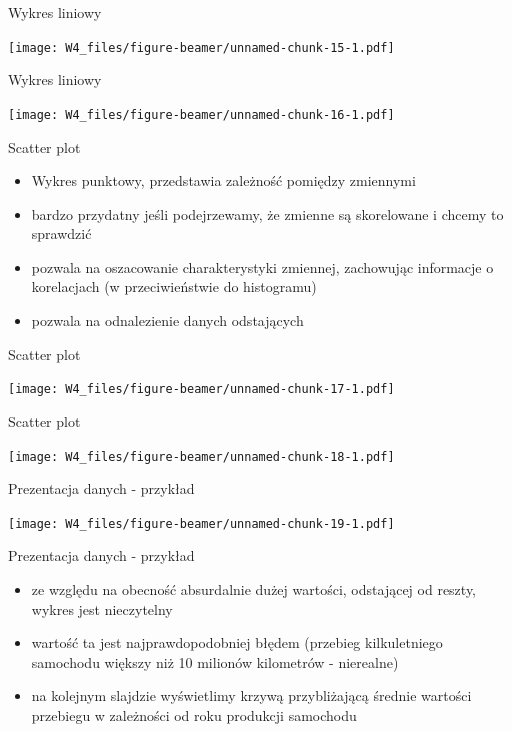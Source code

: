 \documentclass[ignorenonframetext,]{beamer}
\providecommand{\tightlist}{%
\setlength{\itemsep}{0pt}\setlength{\parskip}{0pt}}
\begin{document}
\begin{frame}{Wykres liniowy}

\texttt{[image: W4\_files/figure-beamer/unnamed-chunk-15-1.pdf]}

\end{frame}

\begin{frame}{Wykres liniowy}

\texttt{[image: W4\_files/figure-beamer/unnamed-chunk-16-1.pdf]}

\end{frame}

\begin{frame}{Scatter plot}

\begin{itemize}
\tightlist
\item
  Wykres punktowy, przedstawia zależność pomiędzy zmiennymi
\item
  bardzo przydatny jeśli podejrzewamy, że zmienne są skorelowane i
  chcemy to sprawdzić
\item
  pozwala na oszacowanie charakterystyki zmiennej, zachowując informacje
  o korelacjach (w przeciwieństwie do histogramu)
\item
  pozwala na odnalezienie danych odstających
\end{itemize}

\end{frame}

\begin{frame}{Scatter plot}

\texttt{[image: W4\_files/figure-beamer/unnamed-chunk-17-1.pdf]}

\end{frame}

\begin{frame}{Scatter plot}

\texttt{[image: W4\_files/figure-beamer/unnamed-chunk-18-1.pdf]}

\end{frame}

\begin{frame}{Prezentacja danych - przykład}

\texttt{[image: W4\_files/figure-beamer/unnamed-chunk-19-1.pdf]}

\end{frame}

\begin{frame}{Prezentacja danych - przykład}

\begin{itemize}
\tightlist
\item
  ze względu na obecność absurdalnie dużej wartości, odstającej od
  reszty, wykres jest nieczytelny
\item
  wartość ta jest najprawdopodobniej błędem (przebieg kilkuletniego
  samochodu większy niż 10 milionów kilometrów - nierealne)
\item
  na kolejnym slajdzie wyświetlimy krzywą przybliżającą średnie wartości
  przebiegu w zależności od roku produkcji samochodu
\end{itemize}

\end{frame}
\end{document}
